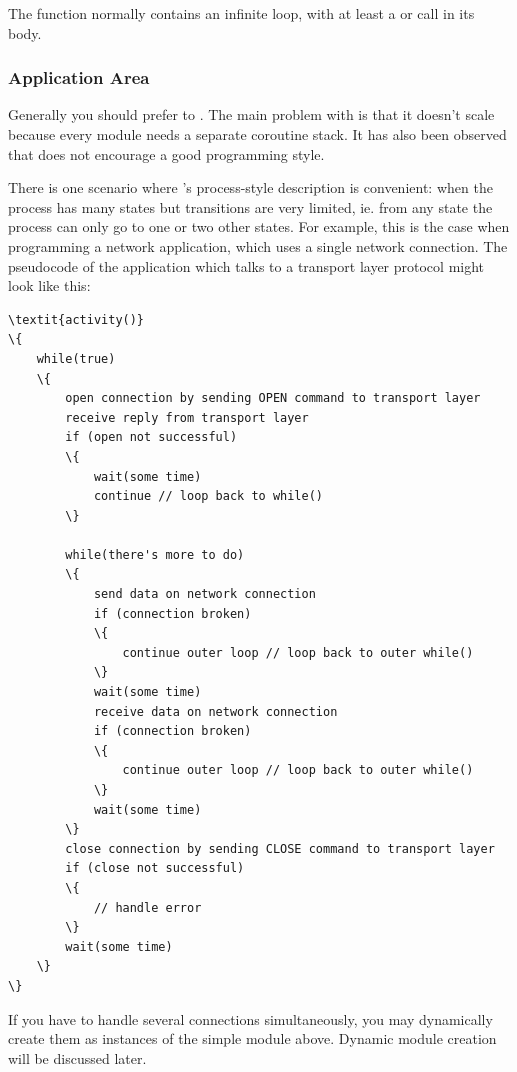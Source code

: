 The  function normally contains an infinite loop,
with at least a  or  call in its body.



\subsubsection{Application Area}

Generally you should prefer  to .
The main problem with  is that it doesn't scale because
every module needs a separate coroutine stack. It has also been observed
that  does not encourage a good programming style.

There is one scenario where 's process-style
description is convenient: when the process has many
states but transitions are very limited, ie. from any state the
process can only go to one or two other states.  For example, this is
the case when programming a network application, which uses a single
network connection.  The pseudocode of the application which talks to
a transport layer protocol might look like this:

\begin{Verbatim}[commandchars=\\\{\}]
\textit{activity()}
\{
    while(true)
    \{
        open connection by sending OPEN command to transport layer
        receive reply from transport layer
        if (open not successful)
        \{
            wait(some time)
            continue // loop back to while()
        \}

        while(there's more to do)
        \{
            send data on network connection
            if (connection broken)
            \{
                continue outer loop // loop back to outer while()
            \}
            wait(some time)
            receive data on network connection
            if (connection broken)
            \{
                continue outer loop // loop back to outer while()
            \}
            wait(some time)
        \}
        close connection by sending CLOSE command to transport layer
        if (close not successful)
        \{
            // handle error
        \}
        wait(some time)
    \}
\}
\end{Verbatim}

If you have to handle several connections simultaneously, you may
dynamically create them as instances of the simple module above.
Dynamic module creation will be discussed later.

